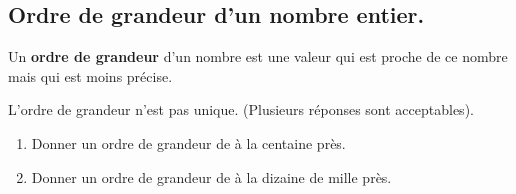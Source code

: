 \documentclass[a4paper]{book}
\begin{document}
\subsection{Ordre de grandeur d'un nombre entier.}
    \begin{definition}
        Un \textbf{ordre de grandeur} d'un nombre est une valeur qui est proche de ce nombre mais qui est moins précise.

        L'ordre de grandeur n'est pas unique. (Plusieurs réponses sont acceptables).
    \end{definition}


    \begin{exemple}
        \begin{enumerate}
            \item Donner un ordre de grandeur de  à la centaine près.

            \points[38]

            \item Donner un ordre de grandeur de  à la dizaine de mille près.

            \points[38]
        \end{enumerate}
    \end{exemple}
\end{document}
